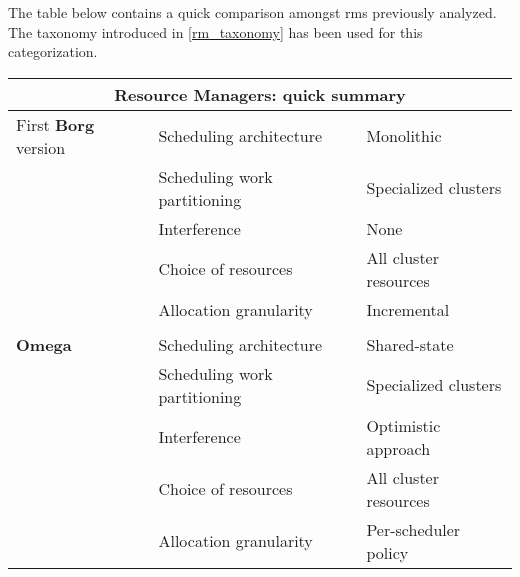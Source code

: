 The table below contains a quick comparison amongst \glspl{rm} previously analyzed.
The taxonomy introduced in \autoref{rm_taxonomy} has been used for this categorization.

\begin{table}[ht]
\begin{center}
\begin{tabular}{lll}

\multicolumn{3}{c}{\textbf{Resource Managers: quick summary}} \\ \hline
\multicolumn{1}{l|}{First \textbf{Borg \cite{borg}} version} 
                                   & Scheduling architecture      & Monolithic              \\ \cline{2-3} 
\multicolumn{1}{l|}{}              & Scheduling work partitioning & Specialized clusters    \\ \cline{2-3} 
\multicolumn{1}{l|}{}              & Interference                 & None                    \\ \cline{2-3} 
\multicolumn{1}{l|}{}              & Choice of resources          & All cluster resources   \\ \cline{2-3}  
\multicolumn{1}{l|}{}              & Allocation granularity       & Incremental              \\ \cline{2-3}

\multicolumn{3}{c}{} \\ \hline
\multicolumn{1}{l|}{\textbf{Omega \cite{omega}}} 
                                   & Scheduling architecture      & Shared-state            \\ \cline{2-3} 
\multicolumn{1}{l|}{}              & Scheduling work partitioning & Specialized clusters    \\ \cline{2-3} 
\multicolumn{1}{l|}{}              & Interference                 & Optimistic approach     \\ \cline{2-3} 
\multicolumn{1}{l|}{}              & Choice of resources          & All cluster resources   \\ \cline{2-3} 
\multicolumn{1}{l|}{}              & Allocation granularity       & Per-scheduler policy    \\ \cline{2-3} 


\end{tabular}
\end{center}
\end{table}
